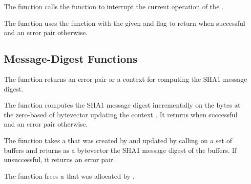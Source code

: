 The  function calls the
 function to interrupt the current operation
of the .

\begin{function}
\end{function}

The  function uses the
 function with the given  and
 flag to return 
when successful and an error pair otherwise.

\subsection {Message-Digest Functions}

\begin{function}
\end{function}

The  function returns an error pair
or a context for computing the SHA1 message digest.

\begin{function}
\end{function}

The  function computes the SHA1 message digest
incrementally on the  bytes at the zero-based 
of bytevector  updating the context .
It returns  when successful and an error pair otherwise.

\begin{function}
\end{function}

The  function takes a  that was created by
 and updated by calling  on a set
of buffers and returns as a bytevector the SHA1 message digest of the buffers.
If unsuccessful, it returns an error pair.

\begin{function}
\end{function}

The  function frees a 
that was allocated by .
